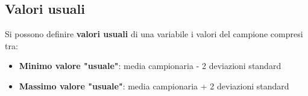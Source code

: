 \documentclass[a4paper]{article}
\theoremstyle{break}
\theoremstyle{break}
\theoremstyle{break}
\theoremstyle{break}
\begin{document}
\subsection{Valori usuali}
Si possono definire \textbf{valori usuali} di una variabile i valori del campione compresi
tra:
\begin{itemize}
	\item \textbf{Minimo valore "usuale"}: media campionaria - 2 deviazioni standard
	\item \textbf{Massimo valore "usuale"}: media campionaria + 2 deviazioni standard
\end{itemize}
\end{document}
